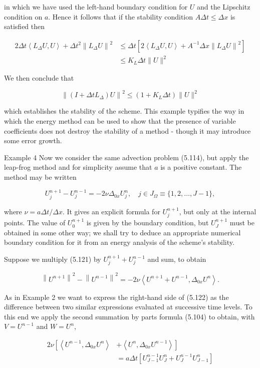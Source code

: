 \documentclass[10pt]{article}
\begin{document}
in which we have used the left-hand boundary condition for \(U\) and the Lipschitz condition on \(a\). Hence it follows that if the stability condition \(A \Delta t \leq \Delta x\) is satisfied then

\[
\begin{aligned}
2 \Delta t\left\langle L_{\Delta} U, U\right\rangle+\Delta t^{2}\left\|L_{\Delta} U\right\|^{2} & \leq \Delta t\left[2\left\langle L_{\Delta} U, U\right\rangle+A^{-1} \Delta x\left\|L_{\Delta} U\right\|^{2}\right] \\
& \leq K_{L} \Delta t\|U\|^{2}
\end{aligned}
\]

We then conclude that

\[
\left\|\left(I+\Delta t L_{\Delta}\right) U\right\|^{2} \leq\left(1+K_{L} \Delta t\right)\|U\|^{2}
\]

which establishes the stability of the scheme. This example typifies the way in which the energy method can be used to show that the presence of variable coefficients does not destroy the stability of a method - though it may introduce some error growth.

Example 4 Now we consider the same advection problem (5.114), but apply the leap-frog method and for simplicity assume that \(a\) is a positive constant. The method may be written

\[
U_{j}^{n+1}-U_{j}^{n-1}=-2 \nu \Delta_{0 x} U_{j}^{n}, \quad j \in J_{\Omega} \equiv\{1,2, \ldots, J-1\},
\]

where \(\nu=a \Delta t / \Delta x\). It gives an explicit formula for \(U_{j}^{n+1}\), but only at the internal points. The value of \(U_{0}^{n+1}\) is given by the boundary condition, but \(U_{J}^{n+1}\) must be obtained in some other way; we shall try to deduce an appropriate numerical boundary condition for it from an energy analysis of the scheme's stability.

Suppose we multiply (5.121) by \(U_{j}^{n+1}+U_{j}^{n-1}\) and sum, to obtain

\[
\left\|U^{n+1}\right\|^{2}-\left\|U^{n-1}\right\|^{2}=-2 \nu\left\langle U^{n+1}+U^{n-1}, \Delta_{0 x} U^{n}\right\rangle .
\]

As in Example 2 we want to express the right-hand side of (5.122) as the difference between two similar expressions evaluated at successive time levels. To this end we apply the second summation by parts formula (5.104) to obtain, with \(V=U^{n-1}\) and \(W=U^{n}\),

\[
\begin{aligned}
2 \nu\left[\left\langle U^{n-1}, \Delta_{0 x} U^{n}\right\rangle\right. & \left.+\left\langle U^{n}, \Delta_{0 x} U^{n-1}\right\rangle\right] \\
& =a \Delta t\left[U_{J-1}^{n-1} U_{J}^{n}+U_{J}^{n-1} U_{J-1}^{n}\right]
\end{aligned}
\]
\end{document}
